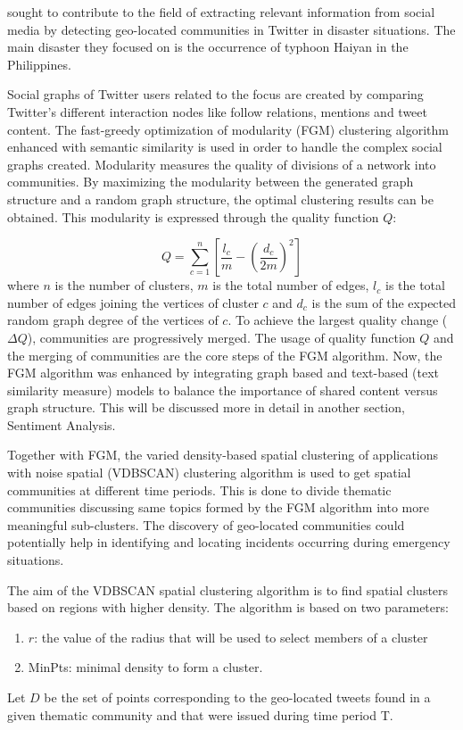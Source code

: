  sought to contribute to the field of extracting relevant information from social media by detecting geo-located communities in Twitter in disaster situations. The main disaster they focused on is the occurrence of typhoon Haiyan in the Philippines. 

Social graphs of Twitter users related to the focus are created by comparing Twitter's different interaction nodes like follow relations, mentions and tweet content. The fast-greedy optimization of modularity (FGM) clustering algorithm enhanced with semantic similarity is used in order to handle the complex social graphs created. Modularity measures the quality of divisions of a network into communities. By maximizing the modularity between the generated graph structure and a random graph structure, the optimal clustering results can be obtained. This modularity is expressed through the quality function $Q$:

\begin{equation}
	Q = \sum_{c = 1}^{n} \left [ \frac{l_c}{m} - \left (\frac{d_c}{2m} \right )^2 \right ]
\end{equation}where $n$ is the number of clusters, $m$ is the total number of edges, $l_c$ is the total number of edges joining the vertices of cluster $c$ and $d_c$ is the sum of the expected random graph degree of the vertices of $c$. To achieve the largest quality change ($\Delta$$Q$), communities are progressively merged. The usage of quality function $Q$ and the merging of communities are the core steps of the FGM algorithm. Now, the FGM algorithm was enhanced by integrating graph based and text-based (text similarity measure) models to balance the importance of shared content versus graph structure. This will be discussed more in detail in another section, Sentiment Analysis.

Together with FGM, the varied density-based spatial clustering of applications with noise spatial (VDBSCAN) clustering algorithm is used to get spatial communities at different time periods. This is done to divide thematic communities discussing same topics formed by the FGM algorithm into more meaningful sub-clusters. The discovery of geo-located communities could potentially help in identifying and locating incidents occurring during emergency situations.

The aim of the VDBSCAN spatial clustering algorithm is to find spatial clusters based on regions with higher density. The algorithm is based on two parameters:
\begin{enumerate}
	\item $r$: the value of the radius that will be used to select members of a cluster
	\item MinPts: minimal density to form a cluster.
\end{enumerate}
Let $D$ be the set of points corresponding to the geo-located tweets found in a given thematic community and that were issued during time period T.

